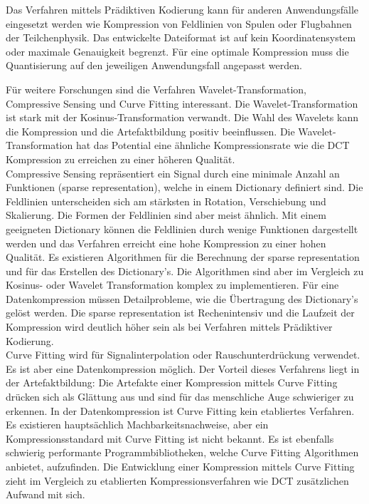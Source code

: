 Das Verfahren mittels Prädiktiven Kodierung kann für anderen Anwendungsfälle eingesetzt werden wie Kompression von Feldlinien von Spulen oder Flugbahnen der Teilchenphysik. Das entwickelte Dateiformat ist auf kein Koordinatensystem oder maximale Genauigkeit begrenzt. Für eine optimale Kompression muss die Quantisierung auf den jeweiligen Anwendungsfall angepasst werden.

Für weitere Forschungen sind die Verfahren Wavelet-Transformation, Compressive Sensing und Curve Fitting interessant. Die Wavelet-Transformation ist stark mit der Kosinus-Transformation verwandt. Die Wahl des Wavelets kann die Kompression und die Artefaktbildung positiv beeinflussen. Die Wavelet-Transformation hat das Potential eine ähnliche Kompressionsrate wie die DCT Kompression zu erreichen zu einer höheren Qualität.\\
Compressive Sensing repräsentiert ein Signal durch eine minimale Anzahl an Funktionen (sparse representation), welche in einem Dictionary definiert sind. Die Feldlinien unterscheiden sich am stärksten in Rotation, Verschiebung und Skalierung. Die Formen der Feldlinien sind aber meist ähnlich. Mit einem geeigneten Dictionary können die Feldlinien durch wenige Funktionen dargestellt werden und das Verfahren erreicht eine hohe Kompression zu einer hohen Qualität. Es existieren Algorithmen für die Berechnung der sparse representation und für das Erstellen des Dictionary's. Die Algorithmen sind aber im Vergleich zu Kosinus- oder Wavelet Transformation komplex zu implementieren. Für eine Datenkompression müssen Detailprobleme, wie die Übertragung des Dictionary's gelöst werden. Die sparse representation ist Rechenintensiv und die Laufzeit der Kompression wird deutlich höher sein als bei Verfahren mittels Prädiktiver Kodierung.\\
Curve Fitting wird für Signalinterpolation oder Rauschunterdrückung verwendet. Es ist aber eine Datenkompression möglich. Der Vorteil dieses Verfahrens liegt in der Artefaktbildung: Die Artefakte einer Kompression mittels Curve Fitting drücken sich als Glättung aus und sind für das menschliche Auge schwieriger zu erkennen. In der Datenkompression ist Curve Fitting kein etabliertes Verfahren. Es existieren hauptsächlich Machbarkeitsnachweise, aber ein Kompressionsstandard mit Curve Fitting ist nicht bekannt. Es ist ebenfalls schwierig performante Programmbibliotheken, welche Curve Fitting Algorithmen anbietet, aufzufinden. Die Entwicklung einer Kompression mittels Curve Fitting zieht im Vergleich zu etablierten Kompressionsverfahren wie DCT zusätzlichen Aufwand mit sich.